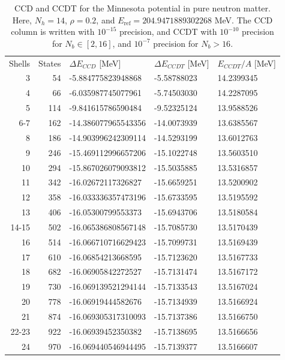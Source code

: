 \documentclass[10pt,twoside]{report}
\begin{document}
	\begin{table}[h]
		\centering
		\captionsetup{width=.8\textwidth}
		\caption{CCD and CCDT for the Minnesota potential in pure neutron matter. Here, $N_h=14$, $\rho = 0.2$, and $E_{\text{ref}}=204.9471889302268$ MeV. The CCD column is written with $10^{-15}$ precision, and CCDT with $10^{-10}$ precision for $N_b\in[2,16]$, and $10^{-7}$ precision for $N_b>16$.}
		\begin{tabular}{rrlll}
			Shells & States & $\Delta E_{CCD}$ [MeV] & $\Delta E_{CCDT}$ [MeV] & $E_{CCDT}/A$ [MeV]\\
			3 & 54 & -5.884775823948868 & -5.58788023 & 14.2399345\\ 
			4 & 66 & -6.035987745077961 & -5.74503030 & 14.2287095\\ 
			5 & 114 & -9.841615786590484 & -9.52325124 & 13.9588526\\ 
			6-7 & 162 & -14.386077965543356 & -14.0073939 & 13.6385567\\ 
			8 & 186 & -14.903996242309114 & -14.5293199 & 13.6012763\\ 
			9 & 246 & -15.469112996657206 & -15.1022748 & 13.5603510\\ 
			10 & 294 & -15.867026079093812 & -15.5035885 & 13.5316857\\ 
			11 & 342 & -16.02672117326827 & -15.6659251 & 13.5200902\\ 
			12 & 358 & -16.033336357473196 & -15.6733595 & 13.5195592\\ 
			13 & 406 & -16.05300799553373 & -15.6943706 & 13.5180584\\ 
			14-15 & 502 & -16.065386808567148 & -15.7085730 & 13.5170439\\ 
			16 & 514 & -16.066710716629423 & -15.7099731 & 13.5169439\\
			17 & 610 & -16.06854213668595 & -15.7123620 & 13.5167733\\ 
			18 & 682 & -16.06905842272527 & -15.7131474 & 13.5167172\\ 
			19 & 730 & -16.069139521294144 & -15.7133543 & 13.5167024\\ 
			20 & 778 & -16.06919444582676 & -15.7134939 & 13.5166924\\
			21 & 874 & -16.069305317310093 & -15.7137386 & 13.5166750\\ 
			22-23 & 922 & -16.06939452350382 & -15.7138695 & 13.5166656\\ 
			24 & 970 & -16.069440546944495 & -15.7139377 & 13.5166607\\ 

\end{tabular}
\end{table}
\end{document}
